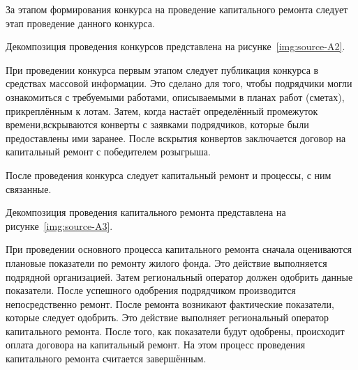 За этапом формирования конкурса на проведение капитального ремонта следует этап проведение данного конкурса.

Декомпозиция проведения конкурсов представлена на рисунке~\ref{img:source-A2}.


При проведении конкурса первым этапом следует публикация конкурса в средствах массовой информации.
Это сделано для того, чтобы подрядчики могли ознакомиться с требуемыми работами, описываемыми в планах работ (сметах), прикреплённым к лотам.
Затем, когда настаёт определённый промежуток времени,\linebreak вскрываются конверты с заявками подрядчиков, которые были предоставлены ими заранее.
После вскрытия конвертов заключается договор на капитальный ремонт с победителем розыгрыша.

После проведения конкурса следует капитальный ремонт и процессы, с ним связанные.

Декомпозиция проведения капитального ремонта представлена на рисунке~\ref{img:source-A3}.


При проведении основного процесса капитального ремонта сначала оцениваются плановые показатели по ремонту жилого фонда.
Это действие выполняется подрядной организацией.
Затем региональный оператор должен одобрить данные показатели.
После успешного одобрения подрядчиком производится непосредственно ремонт.
После ремонта возникают фактические показатели, которые следует одобрить.
Это действие выполняет региональный оператор капитального ремонта.
После того, как показатели будут одобрены, происходит оплата договора на капитальный ремонт.
На этом процесс проведения капитального ремонта считается завершённым.

\clearpage
\newpage